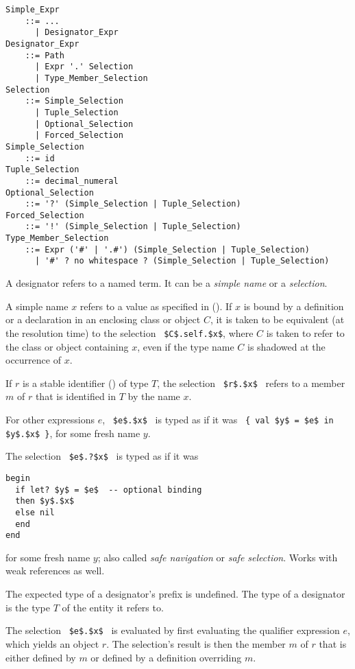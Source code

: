 \grammar\begin{lstlisting}[deletekeywords={no}]
Simple_Expr
    ::= ...
      | Designator_Expr
Designator_Expr 
    ::= Path
      | Expr '.' Selection
      | Type_Member_Selection
Selection 
    ::= Simple_Selection
      | Tuple_Selection
      | Optional_Selection
      | Forced_Selection
Simple_Selection 
    ::= id
Tuple_Selection
    ::= decimal_numeral
Optional_Selection 
    ::= '?' (Simple_Selection | Tuple_Selection)
Forced_Selection
    ::= '!' (Simple_Selection | Tuple_Selection)
Type_Member_Selection
    ::= Expr ('#' | '.#') (Simple_Selection | Tuple_Selection)
      | '#' ? no whitespace ? (Simple_Selection | Tuple_Selection)
\end{lstlisting}

A designator refers to a named term. It can be a {\em simple name} or a {\em selection}.

A simple name $x$ refers to a value as specified in (). If $x$ is bound by a definition or a declaration in an enclosing class or object $C$, it is taken to be equivalent (at the resolution time) to the selection ~\lstinline!$C$.self.$x$!, where $C$ is taken to refer to the class or object containing $x$, even if the type name $C$ is shadowed at the occurrence of $x$. 

If $r$ is a stable identifier () of type $T$, the selection ~\lstinline!$r$.$x$!~ refers to a member $m$ of $r$ that is identified in $T$ by the name $x$. 

For other expressions $e$, ~\lstinline!$e$.$x$!~ is typed as if it was ~\lstinline!{ val $y$ = $e$ in $y$.$x$ }!, for some fresh name $y$. 

The selection ~\lstinline!$e$.?$x$!~ is typed as if it was 
\begin{lstlisting}
begin
  if let? $y$ = $e$  -- optional binding
  then $y$.$x$ 
  else nil 
  end
end
\end{lstlisting}
for some fresh name $y$; also called {\em safe navigation} or {\em safe selection}. Works with weak references as well. 

The expected type of a designator's prefix is undefined. The type of a designator is the type $T$ of the entity it refers to. 

The selection ~\lstinline!$e$.$x$!~ is evaluated by first evaluating the qualifier expression $e$, which yields an object $r$. The selection's result is then the member $m$ of $r$ that is either defined by $m$ or defined by a definition overriding $m$. 

